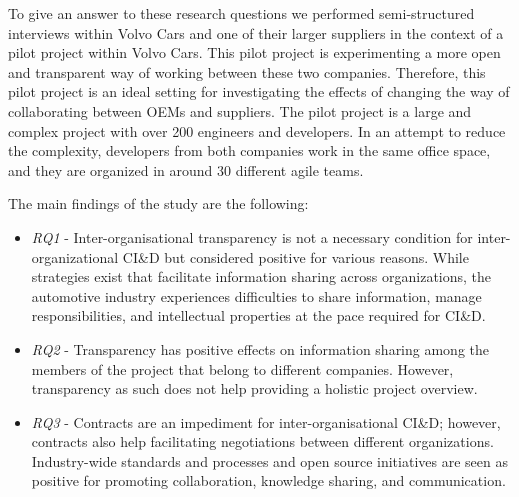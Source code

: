 To give an answer to these research questions we performed semi-structured interviews within Volvo Cars and 
one of their larger suppliers in the context of a pilot project within Volvo Cars. This pilot project is experimenting a more open and transparent way of working between these two companies. Therefore, this pilot project is an ideal setting for investigating the effects of changing the way of collaborating between OEMs and suppliers.  
The pilot project is a large and complex project with over 200 engineers and developers. 
In an attempt to reduce the complexity, developers from both companies work in the same office space, and they are organized in around 30 different agile teams. %

{The main findings of the study are the following}:
\begin{itemize}
\item {\em RQ1} - Inter-organisational transparency is not a necessary condition for inter-organizational CI\&D but considered positive for various reasons. %
While strategies exist that facilitate information sharing  across organizations, the automotive industry experiences difficulties to share information, manage responsibilities, and intellectual properties at the pace required for CI\&D. %
\item {\em RQ2} - Transparency has positive effects on information sharing among the members of the project that belong to different companies. However, transparency as such does not help providing a holistic project overview.
\item {\em RQ3} - Contracts are an impediment for inter-or\-ga\-nisational CI\&D; however, contracts also help facilitating negotiations between different organizations. Industry-wide standards and processes and open source initiatives are seen as positive for promoting collaboration, knowledge sharing, and communication.
\end{itemize}


